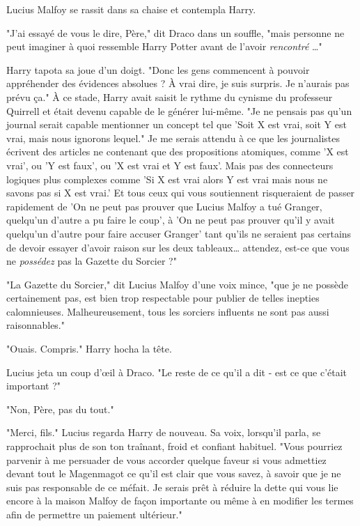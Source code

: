 Lucius Malfoy se rassit dans sa chaise et contempla Harry.

"J'ai essayé de vous le dire, Père," dit Draco dans un souffle, "mais personne ne peut imaginer à quoi ressemble Harry Potter avant de l'avoir \emph{rencontré} …"

Harry tapota sa joue d'un doigt. "Donc les gens commencent à pouvoir appréhender des évidences absolues ? À vrai dire, je suis surpris. Je n'aurais pas prévu ça." À ce stade, Harry avait saisit le rythme du cynisme du professeur Quirrell et était devenu capable de le générer lui-même. "Je ne pensais pas qu'un journal serait capable mentionner un concept tel que 'Soit X est vrai, soit Y est vrai, mais nous ignorons lequel." Je me serais attendu à ce que les journalistes écrivent des articles ne contenant que des propositions atomiques, comme 'X est vrai', ou 'Y est faux', ou 'X est vrai et Y est faux'. Mais pas des connecteurs logiques plus complexes comme 'Si X est vrai alors Y est vrai mais nous ne savons pas si X est vrai.' Et tous ceux qui vous soutiennent risqueraient de passer rapidement de 'On ne peut pas prouver que Lucius Malfoy a tué Granger, quelqu'un d'autre a pu faire le coup', à 'On ne peut pas prouver qu'il y avait quelqu'un d'autre pour faire accuser Granger' tant qu'ils ne seraient pas certains de devoir essayer d'avoir raison sur les deux tableaux… attendez, est-ce que vous ne \emph{possédez}  pas la Gazette du Sorcier ?"

"La Gazette du Sorcier," dit Lucius Malfoy d'une voix mince, "que je ne possède certainement pas, est bien trop respectable pour publier de telles inepties calomnieuses. Malheureusement, tous les sorciers influents ne sont pas aussi raisonnables."

"Ouais. Compris." Harry hocha la tête.

Lucius jeta un coup d'œil à Draco. "Le reste de ce qu'il a dit - est ce que c'était important ?"

"Non, Père, pas du tout."

"Merci, fils." Lucius regarda Harry de nouveau. Sa voix, lorsqu'il parla, se rapprochait plus de son ton traînant, froid et confiant habituel. "Vous pourriez parvenir à me persuader de vous accorder quelque faveur si vous admettiez devant tout le Magenmagot ce qu'il est clair que vous savez, à savoir que je ne suis pas responsable de ce méfait. Je serais prêt à réduire la dette qui vous lie encore à la maison Malfoy de façon importante ou même à en modifier les termes afin de permettre un paiement ultérieur."

